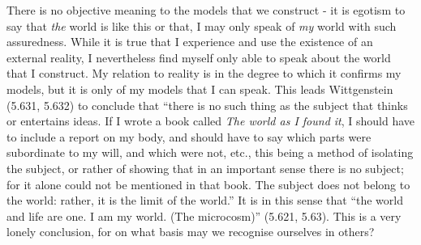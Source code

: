 There is no objective meaning to the models that we construct - 
it is egotism to say that {\em the} world is like this or that,
I may only speak of {\em my} world with such assuredness.
While it is true that I experience and use the existence of an
external reality, 
I nevertheless find myself only able to speak about the world that I
construct.
My relation to reality is in the degree to which it confirms my
models,
but it is only of my models that I can speak.
This leads Wittgenstein (5.631, 5.632) to conclude that 
``there is no such thing as the subject that thinks or entertains
ideas.
If I wrote a book called {\em The world as I found it},
I should have to include a report on my body, and should have to say
which parts were subordinate to my will,
and which were not, etc., this being a method of isolating the subject,
or rather of showing that in an important sense there is no subject;
for it alone could not be mentioned in that book.
The subject does not belong to the world: rather, it is the limit of
the world.''
It is in this sense that
``the world and life are one. I am my world. (The microcosm)''
(5.621, 5.63).
This is a very lonely conclusion, 
for on what basis may we recognise ourselves in others?






















